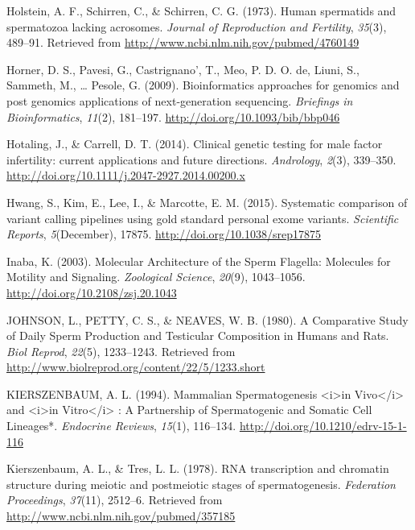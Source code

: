 \documentclass[12pt,twoside]{reedthesis}
\theoremstyle{definition}
\theoremstyle{definition}
\theoremstyle{remark}
\begin{document}
  \hypertarget{ref-Holstein1973}{}
  Holstein, A. F., Schirren, C., \& Schirren, C. G. (1973). Human
  spermatids and spermatozoa lacking acrosomes. \emph{Journal of
  Reproduction and Fertility}, \emph{35}(3), 489--91. Retrieved from
  \url{http://www.ncbi.nlm.nih.gov/pubmed/4760149}
  
  \hypertarget{ref-Horner2009}{}
  Horner, D. S., Pavesi, G., Castrignano', T., Meo, P. D. O. de, Liuni,
  S., Sammeth, M., \ldots{} Pesole, G. (2009). Bioinformatics approaches
  for genomics and post genomics applications of next-generation
  sequencing. \emph{Briefings in Bioinformatics}, \emph{11}(2), 181--197.
  \url{http://doi.org/10.1093/bib/bbp046}
  
  \hypertarget{ref-Hotaling2014}{}
  Hotaling, J., \& Carrell, D. T. (2014). Clinical genetic testing for
  male factor infertility: current applications and future directions.
  \emph{Andrology}, \emph{2}(3), 339--350.
  \url{http://doi.org/10.1111/j.2047-2927.2014.00200.x}
  
  \hypertarget{ref-Hwang2015}{}
  Hwang, S., Kim, E., Lee, I., \& Marcotte, E. M. (2015). Systematic
  comparison of variant calling pipelines using gold standard personal
  exome variants. \emph{Scientific Reports}, \emph{5}(December), 17875.
  \url{http://doi.org/10.1038/srep17875}
  
  \hypertarget{ref-Inaba2003}{}
  Inaba, K. (2003). Molecular Architecture of the Sperm Flagella:
  Molecules for Motility and Signaling. \emph{Zoological Science},
  \emph{20}(9), 1043--1056. \url{http://doi.org/10.2108/zsj.20.1043}
  
  \hypertarget{ref-Johnson1980}{}
  JOHNSON, L., PETTY, C. S., \& NEAVES, W. B. (1980). A Comparative Study
  of Daily Sperm Production and Testicular Composition in Humans and Rats.
  \emph{Biol Reprod}, \emph{22}(5), 1233--1243. Retrieved from
  \url{http://www.biolreprod.org/content/22/5/1233.short}
  
  \hypertarget{ref-KIERSZENBAUM1994}{}
  KIERSZENBAUM, A. L. (1994). Mammalian Spermatogenesis
  \textless{}i\textgreater{}in Vivo\textless{}/i\textgreater{} and
  \textless{}i\textgreater{}in Vitro\textless{}/i\textgreater{} : A
  Partnership of Spermatogenic and Somatic Cell Lineages*. \emph{Endocrine
  Reviews}, \emph{15}(1), 116--134.
  \url{http://doi.org/10.1210/edrv-15-1-116}
  
  \hypertarget{ref-Kierszenbaum1978}{}
  Kierszenbaum, A. L., \& Tres, L. L. (1978). RNA transcription and
  chromatin structure during meiotic and postmeiotic stages of
  spermatogenesis. \emph{Federation Proceedings}, \emph{37}(11), 2512--6.
  Retrieved from \url{http://www.ncbi.nlm.nih.gov/pubmed/357185}
  
\end{document}
